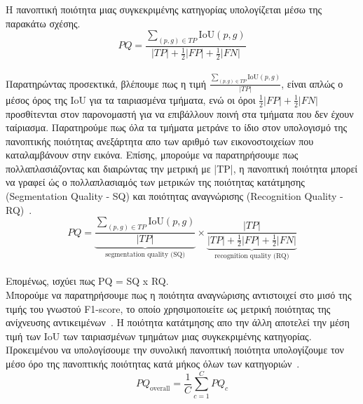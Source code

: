 \documentclass[12pt]{article}
\numberwithin{equation}{section}
\begin{document}
\noindent Η πανοπτική ποιότητα μιας συγκεκριμένης κατηγορίας υπολογίζεται μέσω της παρακάτω σχέσης. \\

\begin{equation}
PQ = \frac{\sum_{(p, g) \in TP} \mathrm{IoU}(p, g)}{|TP| + \tfrac{1}{2}|FP| + \tfrac{1}{2}|FN|}
\end{equation}\\

Παρατηρώντας προσεκτικά, βλέπουμε πως η τιμή \(\frac{\sum_{(p, g) \in TP} \mathrm{IoU}(p, g)}{|TP| }\), είναι απλώς ο μέσος όρος της IoU για τα ταιριασμένα τμήματα, ενώ οι όροι \(\tfrac{1}{2}|FP| + \tfrac{1}{2}|FN|\) προσθίτενται στον παρονομαστή για να επιβάλλουν ποινή στα τμήματα που δεν έχουν ταίριασμα. Παρατηρούμε πως όλα τα τμήματα μετράνε το ίδιο στον υπολογισμό της πανοπτικής ποιότητας ανεξάρτητα απο των αριθμό των εικονοστοιχείων που καταλαμβάνουν στην εικόνα. Επίσης, μπορούμε να παρατηρήσουμε πως πολλαπλασιάζοντας και διαιρώντας την μετρική με |TP|, η πανοπτική ποιότητα μπορεί να γραφεί ώς ο πολλαπλασιαμός των μετρικών της ποιότητας κατάτμησης (Segmentation Quality - SQ) και ποιότητας αναγνώρισης (Recognition Quality - RQ)~\cite{Kirillov_2019_CVPR}. \\

\begin{equation}
PQ = \underbrace{\frac{\sum_{(p,g)\in TP} \mathrm{IoU}(p,g)}{|TP|}}_{\text{segmentation quality (SQ)}} \times \underbrace{\frac{|TP|}{|TP| + \tfrac{1}{2}|FP| + \tfrac{1}{2}|FN|}}_{\text{recognition quality (RQ)}}
\end{equation} \\

\noindent Επομένως, ισχύει πως PQ = SQ x RQ. \\

\noindent Μπορούμε να παρατηρήσουμε πως η ποιότητα αναγνώρισης αντιστοιχεί στο μισό της τιμής του γνωστού F1-score, το οποίο χρησιμοποιείτε ως μετρική ποιότητας της ανίχνευσης αντικειμένων~\cite{elharrouss2021panopticsegmentationreview}. Η ποιότητα κατάτμησης απο την άλλη αποτελεί την μέση τιμή των IoU των ταιριασμένων τμημάτων μιας συγκεκριμένης κατηγορίας. Προκειμένου να υπολογίσουμε την συνολική πανοπτική ποιότητα υπολογίζουμε τον μέσο όρο της πανοπτικής ποιότητας κατά μήκος όλων των κατηγοριών~\cite{Kirillov_2019_CVPR}.  \\

\begin{equation}
PQ_{\text{overall}} = \frac{1}{C} \sum_{c=1}^{C} PQ_c
\end{equation} \\
\end{document}
